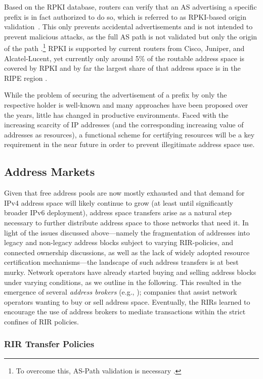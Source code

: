 \documentclass[letter]{sigcomm-alternate}
\begin{document}
Based on the RPKI database, routers can verify that an AS advertising a 
specific 
prefix is in fact authorized to do so, which is referred to as RPKI-based 
origin validation~\cite{rfc7115}. This only prevents accidental advertisements 
and is not intended to prevent malicious attacks, as the full AS path is not
validated but only the origin of the path \cite{randy_rpki}.\footnote{To 
overcome this, AS-Path validation is necessary \cite{bgpsec}.} 
RPKI is supported by current routers from Cisco, Juniper, and Alcatel-Lucent, yet currently only 
around 5\% of the routable address space is covered by RPKI and by far the 
largest share of that address space is in the RIPE region 
\cite{ripe_rpki_stats}. 

While the problem of securing the advertisement of a prefix by only the
respective holder is well-known and many approaches have been proposed over the
years, little has changed in productive environments. 
Faced with the increasing scarcity of IP addresses (and the corresponding 
increasing value of addresses as resources), a functional scheme for certifying 
resources will be a key requirement in the near future in order to prevent 
illegitimate address space use.

\subsection{Address Markets} Given that free address pools are now
mostly exhausted and that demand for IPv4 address space will likely
continue to grow (at least until significantly broader IPv6 deployment),
address space transfers arise as a natural step necessary to further
distribute address space to those networks that need it. In light of the
issues discussed above---namely the fragmentation of addresses into
legacy and non-legacy address blocks subject to varying RIR-policies,
and connected ownership discussions, as well as the lack of widely
adopted resource certification mechanisms---the landscape of such
address transfers is at best murky.  Network operators have already
started buying and selling address blocks under varying conditions, as
we outline in the following.  This resulted in the emergence of several
\textit{address brokers} (e.g.,
\cite{addrex,iptrading,ipv4marketgroup}); companies that assist network
operators wanting to buy or sell address space.  Eventually, the RIRs
learned to encourage the use of address brokers to mediate transactions
within the strict confines of RIR policies.


\subsubsection{RIR Transfer Policies}
\end{document}
